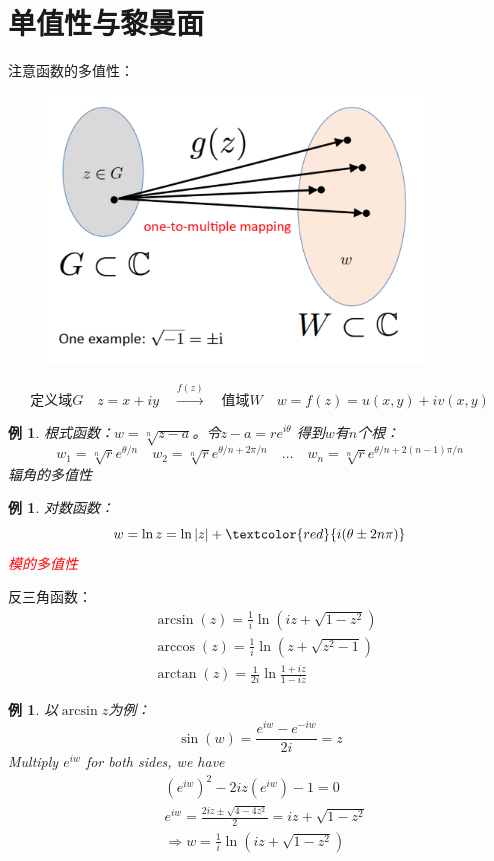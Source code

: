 \documentclass[10pt, a4paper, oneside]{ctexbook}
\newtheorem{example}[theorem]{例}
\begin{document}
\section{单值性与黎曼面}
注意函数的多值性：
\begin{figure}[h]
    \includegraphics[width=0.9\textwidth]{./assets/multi-value.png}
\end{figure}
\begin{equation*}
    \text{定义域$G$}\quad z=x+i y \quad \xrightarrow{f(z)} \quad \text{值域$W$} \quad w=f(z)=u(x, y)+i v(x, y)
\end{equation*}
\begin{example}
    根式函数：$w=\sqrt[n]{z-a}$。令$z-a=re^{i\theta}$
    得到$w$有$n$个根：
    $$
    w_1=\sqrt[n]{r}e^{\theta/n}\quad
    w_2=\sqrt[n]{r}e^{\theta/n+2\pi/n}\quad
    \dots \quad
    w_n=\sqrt[n]{r}e^{\theta/n+2(n-1)\pi/n}
    $$
    辐角的多值性                                                           
\end{example}
\begin{example}
    对数函数：
$$
w=\ln z=\ln |z| +\textcolor{red}{i(\theta \pm 2n\pi)}
$$
\textcolor{red}{模的多值性}
\end{example}
反三角函数：
\begin{align*}
&\arcsin (z)=\frac{1}{i} \ln \left(i z+\sqrt{1-z^{2}}\right) \\ 
&\arccos (z)=\frac{1}{i} \ln \left(z+\sqrt{z^{2}-1}\right)\\ 
&\arctan (z)=\frac{1}{2 i} \ln \frac{1+i z}{1-i z}
\end{align*}
\begin{example}
    以$\arcsin z$为例：
    $$
\sin (w)=\frac{e^{i w}-e^{-i w}}{2 i}=z
$$
{\rm Multiply $e^{i w}$ for both sides, we have}
$$
\begin{aligned}
&\left(e^{i w}\right)^{2}-2 i z\left(e^{i w}\right)-1=0 \\
&e^{i w}=\frac{2 i z \pm \sqrt{4-4 z^{2}}}{2}=i z+\sqrt{1-z^{2}} \\
&\Rightarrow w=\frac{1}{i} \ln \left(i z+\sqrt{1-z^{2}}\right)
\end{aligned}
$$
\end{example}
\end{document}
